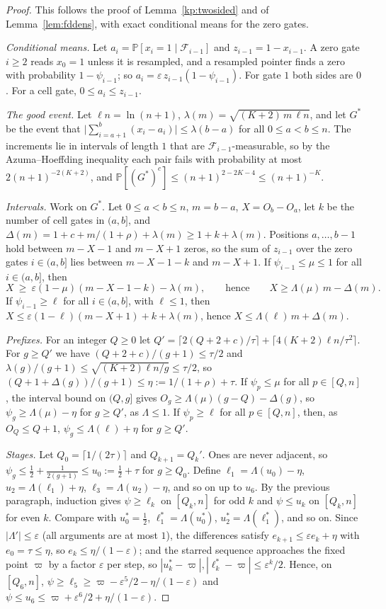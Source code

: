 \documentclass[11pt]{amsart}
\theoremstyle{definition}
\theoremstyle{remark}
\newcommand{\eps}{\varepsilon}
\newcommand{\PP}{\mathbb{P}}
\newcommand{\cF}{\mathcal{F}}
\begin{document}
\begin{proof}
This follows the proof of Lemma~\ref{kp:twosided} and of Lemma~\ref{lem:fddens}, with exact conditional
means for the zero gates.

\emph{Conditional means.} Let $a_i=\PP[x_i=1\mid\cF_{i-1}]$ and $z_{i-1}=1-x_{i-1}$. A zero gate
$i\ge2$ reads $x_0=1$ unless it is resampled, and a resampled pointer finds a zero with probability
$1-\psi_{i-1}$; so $a_i=\eps\,z_{i-1}(1-\psi_{i-1})$. For gate $1$ both sides are $0$. For a cell
gate, $0\le a_i\le z_{i-1}$.

\emph{The good event.} Let $\ell n=\ln(n+1)$, $\lambda(m)=\sqrt{(K+2)\,m\,\ell n}$, and let $G^*$
be the event that $\bigl|\sum_{i=a+1}^b(x_i-a_i)\bigr|\le\lambda(b-a)$ for all $0\le a<b\le n$. The
increments lie in intervals of length $1$ that are $\cF_{i-1}$-measurable, so by the
Azuma--Hoeffding inequality each pair fails with probability at most $2(n+1)^{-2(K+2)}$, and
$\PP[(G^*)^c]\le(n+1)^{2-2K-4}\le(n+1)^{-K}$.

\emph{Intervals.} Work on $G^*$. Let $0\le a<b\le n$, $m=b-a$, $X=O_b-O_a$, let $k$ be the number of
cell gates in $(a,b]$, and $\Delta(m)=1+c+m/(1+\rho)+\lambda(m)\ge1+k+\lambda(m)$. Positions
$a,\dots,b-1$ hold between $m-X-1$ and $m-X+1$ zeros, so the sum of $z_{i-1}$ over the zero gates
$i\in(a,b]$ lies between $m-X-1-k$ and $m-X+1$. If $\psi_{i-1}\le\mu\le1$ for all $i\in(a,b]$, then
\[
X\ \ge\ \eps(1-\mu)(m-X-1-k)-\lambda(m),\qquad\text{hence}\qquad X\ge\Lambda(\mu)\,m-\Delta(m).
\]
If $\psi_{i-1}\ge\ell$ for all $i\in(a,b]$, with $\ell\le1$, then
$X\le\eps(1-\ell)(m-X+1)+k+\lambda(m)$, hence $X\le\Lambda(\ell)\,m+\Delta(m)$.

\emph{Prefixes.} For an integer $Q\ge0$ let
$Q'=\lceil2(Q+2+c)/\tau\rceil+\lceil4(K+2)\ell n/\tau^2\rceil$. For $g\ge Q'$ we have
$(Q+2+c)/(g+1)\le\tau/2$ and $\lambda(g)/(g+1)\le\sqrt{(K+2)\ell n/g}\le\tau/2$, so
$(Q+1+\Delta(g))/(g+1)\le\eta:=1/(1+\rho)+\tau$. If $\psi_p\le\mu$ for all $p\in[Q,n]$, the
interval bound on $(Q,g]$ gives $O_g\ge\Lambda(\mu)(g-Q)-\Delta(g)$, so $\psi_g\ge\Lambda(\mu)-\eta$
for $g\ge Q'$, as $\Lambda\le1$. If $\psi_p\ge\ell$ for all $p\in[Q,n]$, then, as $O_Q\le Q+1$,
$\psi_g\le\Lambda(\ell)+\eta$ for $g\ge Q'$.

\emph{Stages.} Let $Q_0=\lceil1/(2\tau)\rceil$ and $Q_{k+1}=Q_k'$. Ones are never adjacent, so
$\psi_g\le\frac12+\frac1{2(g+1)}\le u_0:=\frac12+\tau$ for $g\ge Q_0$. Define $\ell_1=\Lambda(u_0)-\eta$,
$u_2=\Lambda(\ell_1)+\eta$, $\ell_3=\Lambda(u_2)-\eta$, and so on up to $u_6$. By the previous
paragraph, induction gives $\psi\ge\ell_k$ on $[Q_k,n]$ for odd $k$ and $\psi\le u_k$ on $[Q_k,n]$
for even $k$. Compare with $u^*_0=\frac12$, $\ell^*_1=\Lambda(u^*_0)$, $u^*_2=\Lambda(\ell^*_1)$, and so on.
Since $|\Lambda'|\le\eps$ (all arguments are at most $1$), the differences satisfy $e_{k+1}\le\eps e_k+\eta$
with $e_0=\tau\le\eta$, so $e_k\le\eta/(1-\eps)$; and the starred sequence approaches the fixed point
$\varpi$ by a factor $\eps$ per step, so $|u^*_k-\varpi|,|\ell^*_k-\varpi|\le\eps^k/2$. Hence, on
$[Q_6,n]$, $\psi\ge\ell_5\ge\varpi-\eps^5/2-\eta/(1-\eps)$ and
$\psi\le u_6\le\varpi+\eps^6/2+\eta/(1-\eps)$.


\end{proof}
\end{document}
